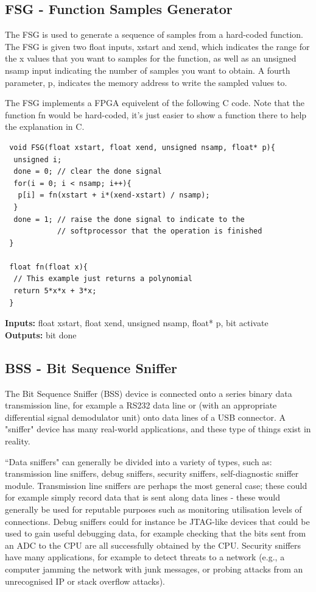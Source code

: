 \subsection{FSG - Function Samples Generator}
The FSG is used to generate a sequence of samples from a hard-coded function. The FSG is given two float inputs, xstart and xend, which indicates the range for the x values that you want to samples for the function, as well as an unsigned nsamp input indicating the number of samples you want to obtain. A fourth parameter, p, indicates the memory address to write the sampled values to.

The FSG implements a FPGA equivelent of the following C code. Note that the function fn would be hard-coded, it's just easier to show a function there to help the explanation in C.

\begin{lstlisting}
 void FSG(float xstart, float xend, unsigned nsamp, float* p){
  unsigned i;
  done = 0; // clear the done signal
  for(i = 0; i < nsamp; i++){
   p[i] = fn(xstart + i*(xend-xstart) / nsamp);
  }
  done = 1; // raise the done signal to indicate to the
            // softprocessor that the operation is finished
 }
 
 float fn(float x){
  // This example just returns a polynomial
  return 5*x*x + 3*x;
 }
\end{lstlisting}

\textbf{Inputs:} float xstart, float xend, unsigned nsamp, float* p, bit activate\\
\textbf{Outputs:} bit done

\subsection{BSS - Bit Sequence Sniffer}
The Bit Sequence Sniffer (BSS) device is connected onto a series binary data transmission line, for example a RS232 data line or (with an appropriate differential signal demodulator unit) onto data lines of a USB connector. A "sniffer" device has many real-world applications, and these type of things exist in reality.

``Data sniffers" can generally be divided into a variety of types, such as: transmission line sniffers, debug sniffers, security sniffers, self-diagnostic sniffer module. Transmission line sniffers are perhaps the most general case; these could for example simply record data that is sent along data lines - these would generally be used for reputable purposes such as monitoring utilisation levels of connections. Debug sniffers could for instance be JTAG-like devices that could be used to gain useful debugging data, for example checking that the bits sent from an ADC to the CPU are all successfully obtained by the CPU. Security sniffers have many applications, for example to detect threats to a network (e.g., a computer jamming the network with junk messages, or probing attacks from an unrecognised IP or stack overflow attacks).


